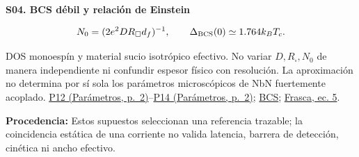 \documentclass[11pt,a4paper]{article}
\newcommand{\origin}[1]{\par{\footnotesize\raggedright\color{ink}\textbf{Procedencia:} #1\par}}
\newcommand{\pref}[2]{\href{Parametros.pdf\#nameddest=#1}{#1 (Parámetros, p.~#2)}}
\newcommand{\assumption}[2]{\par\vspace{6pt}\hypertarget{#1}{\textbf{\color{ink}#1. #2}}\par}
\newcommand{\smallnote}[1]{{\small #1\par}}
\begin{document}
\assumption{S04}{BCS débil y relación de Einstein}
\begin{gather*}
 N_0=(2e^2DR_\square d_f)^{-1},\qquad
 \Delta_{\rm BCS}(0)\simeq1.764k_BT_c .
\end{gather*}
\smallnote{DOS monoespín y material sucio isotrópico efectivo. No variar $D,R_\square,N_0$ de manera independiente ni confundir espesor físico con resolución. La aproximación no determina por sí sola los parámetros microscópicos de NbN fuertemente acoplado. \pref{P12}{2}--\pref{P14}{2}; \href{https://doi.org/10.1103/PhysRev.108.1175}{BCS}; \href{https://arxiv.org/pdf/1904.08596\#page=5}{Frasca, ec. 5}.}
\vfill
\origin{Estos supuestos seleccionan una referencia trazable; la coincidencia estática de una corriente no valida latencia, barrera de detección, cinética ni ancho efectivo.}
\newpage
\end{document}
